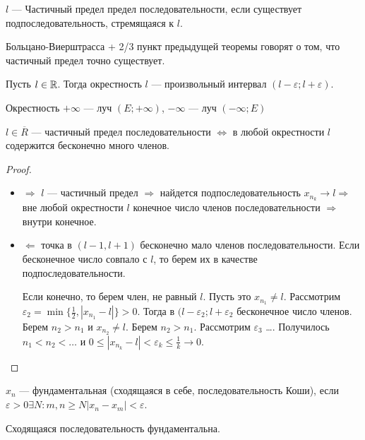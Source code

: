 \begin{definition}
    $l$ --- Частичный предел предел последовательности, если существует подпоследовательность, стремящаяся к $l$.
\end{definition}
\begin{remark}
    Больцано-Виерштрасса + 2/3 пункт предыдущей теоремы говорят о том, что частичный предел точно существует.
\end{remark}
\begin{definition}
    Пусть $l \in \mathbb{R}$. Тогда окрестность  $l$  --- произвольный интервал  $(l-\varepsilon; l+\varepsilon)$.
\end{definition}
\begin{definition}
    Окрестность $+\infty$ --- луч  $(E; +\infty)$,  $-\infty$ --- луч $(-\infty; E)$
\end{definition}
\begin{theorem}
    $l \in \overline{R}$ --- частичный предел последовательности  $\iff $ в любой окрестности  $l$ содержится бесконечно много членов.
\end{theorem}
\begin{proof}
    \slashn
    \begin{itemize}
        \item $\Rightarrow$ $l$ --- частичный предел  $\Rightarrow$ найдется подпоследовательность  $x_{n_k} \to l \Rightarrow$ вне любой окрестности  $l$ конечное число членов последовательности $\Rightarrow$ внутри конечное.
        \item $\Leftarrow$ точка в  $(l-1, l+1)$ бесконечно мало членов последовательности. Если бесконечное число совпало с  $l$, то берем их в качестве подпоследовательности. 

            Если конечно, то берем член, не равный  $l$. Пусть это  $x_{n_1} \neq l$. Рассмотрим  $\varepsilon_2 = \min \{\frac{1}{2}, |x_{n_1} - l|\}>0$. Тогда в $(l-\varepsilon_2; l + \varepsilon_2$ бесконечное число членов. Берем  $n_2 > n_1$ и  $x_{n_2} \neq l$. Берем  $n_2 > n_1$. Рассмотрим $\varepsilon_3$ \ldots. Получилось $n_1 < n_2 < \ldots$ и $0 \le |x_{n_k} - l| < \varepsilon_k \le \frac{1}{k} \to 0$.
    \end{itemize}
\end{proof}
\begin{definition}
    $x_n$ --- фундаментальная (сходящаяся в себе, последовательность Коши), если  $\varepsilon >0 \exists N: m, n \ge N |x_n - x_m| < \varepsilon$.
\end{definition}
\begin{property}
    Сходящаяся последовательность фундаментальна.
\end{property}
